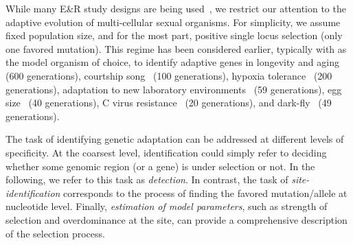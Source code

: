 While many E\&R study designs are being
used~\cite{Barrick2013Genome,schlotterer2015combining}, we restrict
our attention to the adaptive evolution of multi-cellular sexual
organisms.  For simplicity, we assume fixed population size, and for
the most part, positive single locus selection (only one favored
mutation). This regime has been considered earlier, typically with
\dmel as the model organism of choice, to identify adaptive genes in
longevity and aging ~\cite{burke2010genome,remolina2012genomic} (600
generations), courtship song~\cite{turner2011population} (100
generations), hypoxia tolerance~\cite{zhou2011experimental} (200
generations), adaptation to new laboratory
environments~\cite{orozco2012adaptation,franssen2015patterns} (59
generations), egg size~\cite{jha2015whole} (40 generations), C virus
resistance~\cite{martins2014host} (20 generations), and
dark-fly~\cite{izutsu2015dynamics} (49 generations).


The task of identifying genetic adaptation can be addressed at
different levels of specificity. At the coarsest level, identification
could simply refer to deciding whether some genomic region (or a gene)
is under selection or not. In the following, we refer to this task as
\emph{detection}. In contrast, the task of \emph{site-identification}
corresponds to the process of finding the favored mutation/allele at
nucleotide level. Finally, \emph{estimation of model parameters}, such
as strength of selection and overdominance at the site, can provide a
comprehensive description of the selection process.

